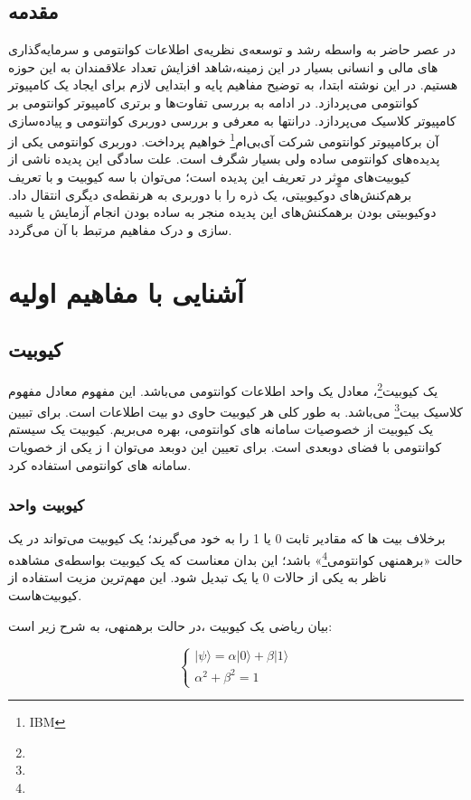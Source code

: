 \documentclass{book}
\begin{document}
\section*{مقدمه}	
در عصر حاضر به‌ واسطه رشد و توسعه‌ی نظریه‌ی اطلاعات کوانتومی و سرمایه‌گذاری های مالی و انسانی بسیار در این زمینه،‌شاهد افزایش تعداد علاقمندان به این حوزه هستیم. در این نوشته ابتدا، به توضیح مفاهیم پایه و ابتدایی لازم برای ایجاد یک کامپیوتر کوانتومی می‌پردازد. در ادامه به بررسی تفاوت‌ها و برتری کامپیوتر کوانتومی بر کامپیوتر کلاسیک می‌پردازد. درانتها به معرفی و بررسی دوربری کوانتومی و پیاده‌سازی آن برکامپیوتر کوانتومی شرکت آی‌بی‌ام\footnote{IBM} خواهیم پرداخت.
دوربری کوانتومی یکی از پدیده‌های کوانتومی ساده ولی بسیار شگرف است. علت سادگی این پدیده ناشی از کیوبیت‌های موٍثر در تعریف این پدیده است؛ می‌توان با سه کیوبیت و با تعریف برهم‌کنش‌های دوکیوبیتی، یک ذره را با دوربری به هرنقطه‌ی دیگری انتقال داد.
دوکیوبیتی بودن برهمکنش‌های این پدیده منجر به ساده بودن انجام آزمایش یا شبیه سازی و درک مفاهیم مرتبط با آن می‌گردد.
\let\cleardoublepage\clearpage
\tableofcontents
\chapter{آشنایی با مفاهیم اولیه}
\section{کیوبیت}

یک کیوبیت\footnote{}، معادل یک واحد اطلاعات کوانتومی می‌باشد. این مفهوم معادل مفهوم کلاسیک بیت\footnote{} می‌باشد. به طور کلی هر کیوبیت حاوی دو بیت اطلاعات است. برای تبیین یک کیوبیت از خصوصیات سامانه های کوانتومی، بهره‌ می‌بریم. کیوبیت یک سیستم کوانتومی با فضای دوبعدی است. برای تعیین این دوبعد می‌توان ا ز یکی از خصویات سامانه های کوانتومی استفاده کرد. 
\subsection{کیوبیت‌ واحد}
برخلاف بیت ها که مقادیر ثابت 0 یا 1 را به خود می‌گیرند؛ یک کیوبیت می‌تواند در یک حالت «برهمنهی کوانتومی\footnote{}» باشد؛ این بدان معناست که یک کیوبیت بواسطه‌ی مشاهده ناظر به یکی از حالات 0 یا یک تبدیل شود. این مهم‌ترین مزیت استفاده از کیوبیت‌هاست. 

\pagebreak

بیان ریاضی یک کیوبیت ،در حالت برهمنهی، به شرح زیر است:
\vspace{0.5cm}

\begin{equation}\label{psi ket}
	\left\{
	\begin{array}{ll}
		\vert \psi \rangle = \alpha\vert 0 \rangle + \beta\vert 1 \rangle \\
		\alpha^2 + \beta^2 = 1
	\end{array}
	\right.
\end{equation}
\end{document}

